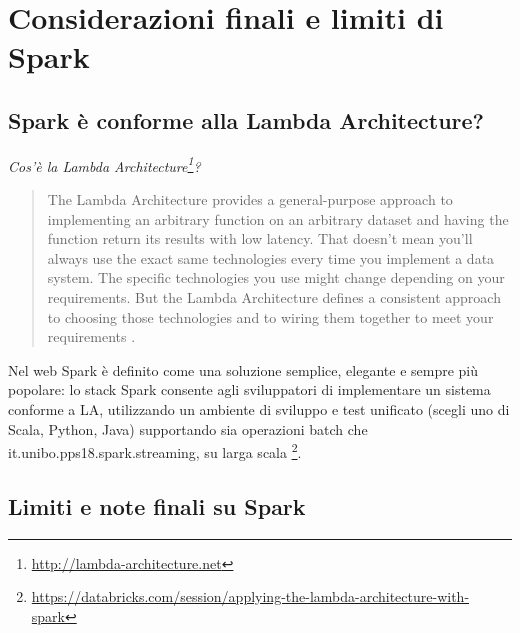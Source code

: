 \documentclass[12pt,italian]{article}
\begin{document}
\section{Considerazioni finali e limiti di Spark}
\subsection{Spark è conforme alla Lambda Architecture?}
\textit{Cos'è la Lambda Architecture\footnote{\url{http://lambda-architecture.net}}?} 

\begin{quote}
The Lambda Architecture provides a general-purpose approach to implementing an arbitrary function on an arbitrary dataset and having the function return its results with low latency. That doesn’t mean you’ll always use the exact same technologies every time you implement a data system. The specific technologies you use might change depending on your requirements. But the Lambda Architecture defines a consistent approach to choosing those technologies and to wiring them together to meet your requirements \cite{lambdaArchitecture}.
\end{quote}
Nel web Spark è definito come una soluzione semplice, elegante e sempre più popolare: lo stack Spark consente agli sviluppatori di implementare un sistema conforme a LA, utilizzando un ambiente di sviluppo e test unificato (scegli uno di Scala, Python, Java) supportando sia operazioni batch che it.unibo.pps18.spark.streaming, su larga scala \footnote{\url{https://databricks.com/session/applying-the-lambda-architecture-with-spark}}.

\subsection{Limiti e note finali su Spark}
\end{document}
